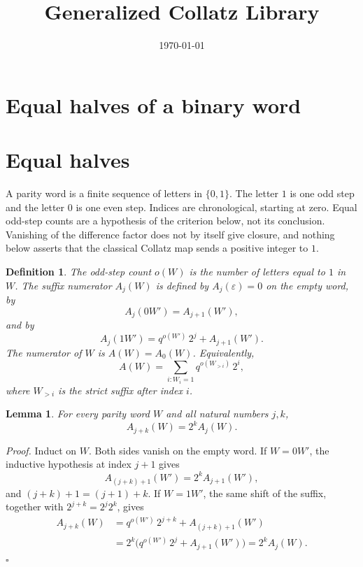 \documentclass[11pt,letterpaper]{article}
\title{Generalized Collatz Library}
\author{}
\date{\today}
\newtheorem{lemma}[theorem]{Lemma}
\newtheorem{definition}[theorem]{Definition}
\newenvironment{proof}{\noindent\textit{Proof.}}{\hfill\(\square\)}
\begin{document}
\maketitle
\section*{Equal halves of a binary word}

\section*{Equal halves}

A parity word is a finite sequence of letters in \(\{0,1\}\). The letter \(1\) is one odd step and the letter \(0\) is one even step. Indices are chronological, starting at zero. Equal odd-step counts are a hypothesis of the criterion below, not its conclusion. Vanishing of the difference factor does not by itself give closure, and nothing below asserts that the classical Collatz map sends a positive integer to \(1\).

\begin{definition}
\label{def:numerator}
The odd-step count \(o(W)\) is the number of letters equal to \(1\) in \(W\). The suffix numerator \(A_j(W)\) is defined by \(A_j(\varepsilon)=0\) on the empty word, by
\[
A_j(0W')=A_{j+1}(W'),
\]
and by
\[
A_j(1W')=q^{o(W')}\,2^j+A_{j+1}(W').
\]
The numerator of \(W\) is \(A(W)=A_0(W)\). Equivalently,
\[
A(W)=\sum_{i:W_i=1}q^{o(W_{>i})}\,2^i,
\]
where \(W_{>i}\) is the strict suffix after index \(i\).
\end{definition}

\begin{lemma}
\label{lem:shift}
For every parity word \(W\) and all natural numbers \(j,k\),
\[
A_{j+k}(W)=2^k A_j(W).
\]
\end{lemma}

\begin{proof}
Induct on \(W\). Both sides vanish on the empty word. If \(W=0W'\), the inductive hypothesis at index \(j+1\) gives
\[
A_{(j+k)+1}(W')=2^k A_{j+1}(W'),
\]
and \((j+k)+1=(j+1)+k\). If \(W=1W'\), the same shift of the suffix, together with \(2^{j+k}=2^j2^k\), gives
\begin{align*}
A_{j+k}(W)
&=q^{o(W')}\,2^{j+k}+A_{(j+k)+1}(W')\\
&=2^k\bigl(q^{o(W')}\,2^j+A_{j+1}(W')\bigr)
=2^k A_j(W).
\end{align*}
\end{proof}
\end{document}
